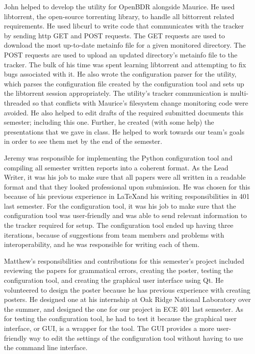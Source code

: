 \documentclass[12 pt]{article}
\begin{document}
	John helped to develop the utility for OpenBDR alongside Maurice. He used libtorrent, the open-source torrenting library, to handle all bittorrent related requirements. He used libcurl to write code that communicates with the tracker by sending http GET and POST requests. The GET requests are used to download the most up-to-date metainfo file for a given monitored directory. The POST requests are used to upload an updated directory's metainfo file to the tracker. The bulk of his time was spent learning libtorrent and attempting to fix bugs associated with it. He also wrote the configuration parser for the utility, which parses the configuration file created by the configuration tool and sets up the libtorrent session appropriately. The utility's tracker communication is multi-threaded so that conflicts with Maurice's filesystem change monitoring code were avoided. He also helped to edit drafts of the required submitted documents this semester; including this one. Further, he created (with some help) the presentations that we gave in class. He helped to work towards our team's goals in order to see them met by the end of the semester.

Jeremy was responsible for implementing the Python configuration tool and compiling all semester written reports into a coherent format. As the Lead Writer, it was his job to make sure that all papers were all written in a readable format and that they looked professional upon submission. He was chosen for this because of his previous experience in \LaTeX and his writing responsibilities in 401 last semester. For the configuration tool, it was his job to make sure that the configuration tool was user-friendly and was able to send relevant information to the tracker required for setup. The configuration tool ended up having three iterations, because of suggestions from team members and problems with interoperability, and he was responsible for writing each of them.
	
 Matthew's responsibilities and contributions for this semester's project included reviewing the papers for grammatical errors, creating the poster, testing the configuration tool, and creating the graphical user interface using Qt. He volunteered to design the poster because he has previous experience with creating posters. He designed one at his internship at Oak Ridge National Laboratory over the summer, and designed the one for our project in ECE 401 last semester. As for testing the configuration tool, he had to test it because the graphical user interface, or GUI, is a wrapper for the tool. The GUI provides a more user-friendly way to edit the settings of the configuration tool without having to use the command line interface.
 
\end{document}
